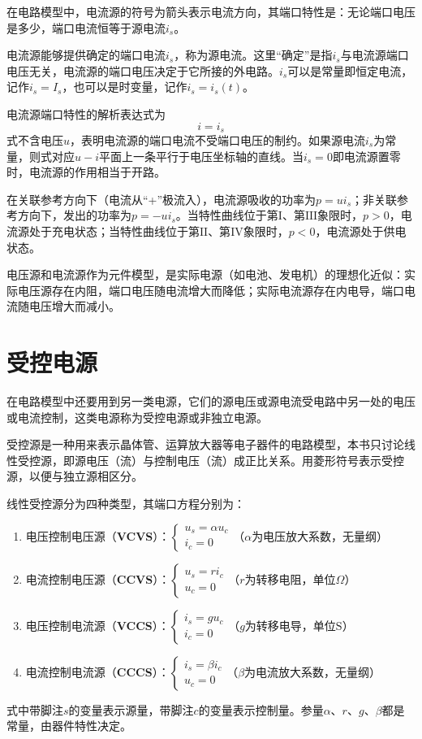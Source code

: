 在电路模型中，电流源的符号为箭头表示电流方向，其端口特性是：无论端口电压是多少，端口电流恒等于源电流$i_s$。

电流源能够提供确定的端口电流$i_s$，称为源电流。这里“确定”是指$i_s$与电流源端口电压无关，电流源的端口电压决定于它所接的外电路。$i_s$可以是常量即恒定电流，记作$i_s=I_s$，也可以是时变量，记作$i_s=i_s(t)$。

电流源端口特性的解析表达式为
\[
i=i_s
\]
式不含电压$u$，表明电流源的端口电流不受端口电压的制约。如果源电流$i_s$为常量，则式对应$u-i$平面上一条平行于电压坐标轴的直线。当$i_s=0$即电流源置零时，电流源的作用相当于开路。

在关联参考方向下（电流从“+”极流入），电流源吸收的功率为$p=ui_s$；非关联参考方向下，发出的功率为$p=-ui_s$。当特性曲线位于第$\mathrm{I}$、第$\mathrm{III}$象限时，$p>0$，电流源处于充电状态；当特性曲线位于第$\mathrm{II}$、第$\mathrm{IV}$象限时，$p<0$，电流源处于供电状态。

电压源和电流源作为元件模型，是实际电源（如电池、发电机）的理想化近似：实际电压源存在内阻，端口电压随电流增大而降低；实际电流源存在内电导，端口电流随电压增大而减小。

\section{受控电源}
在电路模型中还要用到另一类电源，它们的源电压或源电流受电路中另一处的电压或电流控制，这类电源称为受控电源或非独立电源。

受控源是一种用来表示晶体管、运算放大器等电子器件的电路模型，本书只讨论线性受控源，即源电压（流）与控制电压（流）成正比关系。用菱形符号表示受控源，以便与独立源相区分。

线性受控源分为四种类型，其端口方程分别为：
\begin{enumerate}
    \item 电压控制电压源（\textbf{VCVS}）：$\begin{cases}u_s = \alpha u_c \\i_c = 0\end{cases}$（$\alpha$为电压放大系数，无量纲）
    \item 电流控制电压源（\textbf{CCVS}）：$\begin{cases}u_s = r i_c \\u_c = 0\end{cases}$（$r$为转移电阻，单位$\Omega$）
    \item 电压控制电流源（\textbf{VCCS}）：$\begin{cases}i_s = g u_c \\i_c = 0\end{cases}$（$g$为转移电导，单位$\mathrm{S}$）
    \item 电流控制电流源（\textbf{CCCS}）：$\begin{cases}i_s = \beta i_c \\u_c = 0\end{cases}$（$\beta$为电流放大系数，无量纲）
\end{enumerate}
式中带脚注$s$的变量表示源量，带脚注$c$的变量表示控制量。参量$\alpha\text{、}r\text{、}g\text{、}\beta$都是常量，由器件特性决定。

